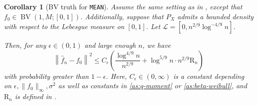 \documentclass[10pt,a4paper]{amsart}
\newtheorem{corollary}{Corollary}
\begin{document}
\begin{corollary}[BV truth for \texttt{MEAN}]\label{cor: BV case} 
Assume the same setting as in , except that $f_0 \in \operatorname{BV}(1, M; [0,1])$. Additionally, suppose that $P_X$ admits a bounded density with respect to the Lebesgue measure on $[0,1]$. Let $\mathcal{L} = [0,n^{2/9} \log^{-4/9} n]$.

Then, for any $\epsilon\in(0,1)$ and large enough $n$, we have
\begin{equation*}
\left\|\widehat{f}_n-f_0\right\|^2 \leq C_\epsilon\left(\frac{\log ^{4 / 9} n}{n^{2 / 9}}+\log ^{5 / 9} n \cdot n^{2 / 9} \mathrm{R}_n\right)
\end{equation*}
with probability greater than $1-\epsilon$. Here, $C_\epsilon \in (0, \infty)$ is a constant depending on $\epsilon, \|f_0\|_\infty, \sigma^2$ as well as constants in \ref{as:q-moment} or \ref{as:beta-weibull}, and $\mathrm{R}_n$ is defined in .
\end{corollary}
\end{document}
